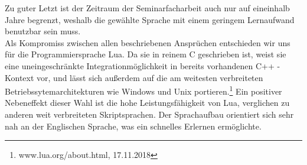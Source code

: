 Zu guter Letzt ist der Zeitraum der Seminarfacharbeit auch nur auf eineinhalb Jahre begrenzt, weshalb die gewählte Sprache mit einem geringem Lernaufwand benutzbar sein muss.\\
Als Kompromiss zwischen allen beschriebenen Ansprüchen entschieden wir uns für die Programmiersprache Lua. Da sie in reinem C geschrieben ist, weist sie eine uneingeschränkte Integrationmöglichkeit in bereits vorhandenen C++ - Kontext vor, und lässt sich außerdem auf die am weitesten verbreiteten Betriebssytemarchitekturen wie Windows und Unix portieren.\footnote{www.lua.org/about.html, 17.11.2018} Ein positiver Nebeneffekt dieser Wahl ist die hohe Leistungsfähigkeit von Lua, verglichen zu anderen weit verbreiteten Skriptsprachen. Der Sprachaufbau orientiert sich sehr nah an der Englischen Sprache, was ein schnelles Erlernen ermöglichte.



